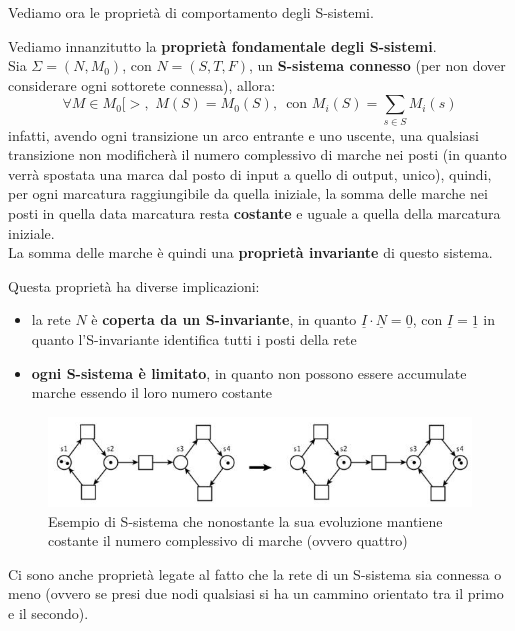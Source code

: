 \documentclass[a4paper,12pt, oneside]{book}
\begin{document}
Vediamo ora le proprietà di comportamento degli S-sistemi.\\
\begin{teorema}
  Vediamo innanzitutto la \textbf{proprietà fondamentale degli S-sistemi}.\\
  Sia $\Sigma=(N,M_0)$, con $N=(S,T,F)$, un \textbf{S-sistema connesso} (per non
  dover considerare ogni sottorete connessa), allora:
  \[\forall M\in M_0[>,\,\, M(S)=M_0(S),\,\mbox{ con }M_i(S)=\sum_{s\in
      S}M_i(s)\]
  infatti, avendo ogni transizione un arco entrante e uno uscente, una qualsiasi
  transizione non modificherà il numero complessivo di marche nei posti (in
  quanto verrà spostata una marca dal posto di input a quello di output, unico),
  quindi, per ogni marcatura raggiungibile da quella iniziale, la somma delle
  marche nei posti in quella data marcatura resta \textbf{costante} e uguale a
  quella della marcatura iniziale.\\
  La somma delle marche è quindi una \textbf{proprietà invariante} di questo
  sistema.
\end{teorema}
Questa proprietà ha diverse implicazioni:
\begin{itemize}
  \item la rete $N$ è \textbf{coperta da un S-invariante}, in quanto
  $\underline{I}\cdot \underline{N}=\underline{0}$, con
  $\underline{I}=\underline{1}$ in quanto l'S-invariante identifica tutti i
  posti della rete
  \item \textbf{ogni S-sistema è limitato}, in quanto non possono essere
  accumulate marche essendo il loro numero costante
\end{itemize}
\begin{figure}[H]
  \centering
  \includegraphics[scale = 0.47]{img/ssi3.jpg}
  \caption{Esempio di S-sistema che nonostante la sua evoluzione mantiene
    costante il numero complessivo di marche (ovvero quattro)} 
\end{figure}
Ci sono anche proprietà legate al fatto che la rete di un S-sistema sia connessa
o meno (ovvero se presi due nodi qualsiasi si ha un cammino orientato tra il
primo e il secondo).\\
\end{document}
